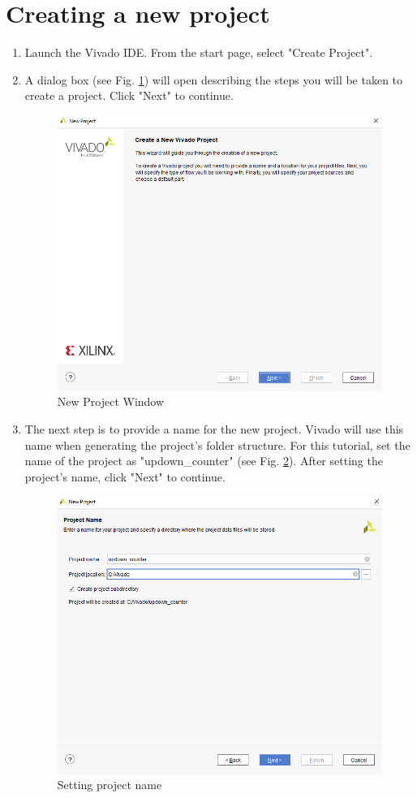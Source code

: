 \documentclass{article}
\begin{document}
\section*{Creating a new project}
  \begin{enumerate}
    \item Launch the Vivado IDE. From the start page, select "Create Project".
    \item A dialog box (see Fig. \ref{fig:1-new_project_window}) will open describing the steps you will be taken to create a project. Click "Next" to continue.
      \begin{figure}[h!]
        \centering
        \includegraphics[width=0.5\linewidth]{img/program/1-new_project_window.png}
        \caption{New Project Window}
        \label{fig:1-new_project_window}
      \end{figure}

    \item The next step is to provide a name for the new project. Vivado will use this name when generating the project's folder structure. For this tutorial,
      set the name of the project as "updown\_counter" (see Fig. \ref{fig:2-project_name}). After setting the project's name, click "Next" to continue.
      \begin{figure}[h!]
        \centering
        \includegraphics[width=0.5\linewidth]{img/program/2-project_name.png}
        \caption{Setting project name}
        \label{fig:2-project_name}
      \end{figure}


\end{enumerate}
\end{document}
